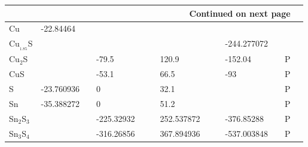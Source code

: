 \documentclass{article}
\begin{document}
\begin{center}
\begin{longtable}{|l|p{2.5cm}|l|p{2.5cm}|l|l|p{2.5cm}|l|l|p{2.5cm}|l|l|l|}
\hline \multicolumn{12}{|r|}{{Continued on next page}} \\ \hline
\endfoot

\hline
\endlastfoot

Cu                 & -22.84464                  & \citep{Barin1977} &                     &     &                                              &                    &     &                                              &                                     &     &                   \\
Cu$_{_1.85}$S           &                            &                   &                     &     &                                              &                    &     &                                              & -244.277072                         &     & \citep{Hiroi1986} \\
Cu$_2$S              &                            &                   & -79.5               &     & \citep{Haynes2013}                           & 120.9              &     & \citep{Haynes2013}                           & -152.04                             &     & P                 \\
CuS                &                            &                   & -53.1               &     & \citep{Haynes2013}                           & 66.5               &     & \citep{Haynes2013}                           & -93                                 &     & P                 \\
S                  & -23.760936                 & \citep{Barin1977} & 0                   &     & \citep{Barin1977}                            & 32.1               &     & \citep{Haynes2013}                           &                                     &     &          P         \\
Sn                 & -35.388272                 & \citep{Barin1977} & 0                   &     & \citep{Barin1977}                            & 51.2               &     & \citep{Haynes2013}                           &                                     &     &           P        \\
Sn$_2$S$_3$            &                            &                   & -225.32932          &     & \citep{Barin1977}                            & 252.537872         &     & \citep{Barin1977}                            & -376.85288                          &     &       P            \\
Sn$_3$S$_4$            &                            &                   & -316.26856          &     & \citep{Barin1977}                            & 367.894936         &     & \citep{Barin1977}                            & -537.003848                         &     &       P            \\

\end{longtable}
\end{center}
\end{document}
